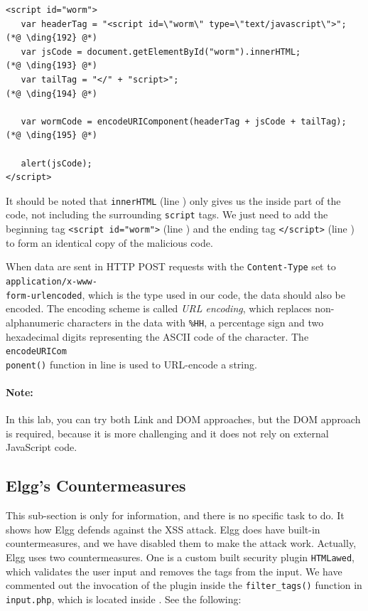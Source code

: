 {\footnotesize
\begin{lstlisting}
<script id="worm">
   var headerTag = "<script id=\"worm\" type=\"text/javascript\">"; (*@ \ding{192} @*)
   var jsCode = document.getElementById("worm").innerHTML;          (*@ \ding{193} @*)
   var tailTag = "</" + "script>";                                  (*@ \ding{194} @*)
   
   var wormCode = encodeURIComponent(headerTag + jsCode + tailTag); (*@ \ding{195} @*)
      
   alert(jsCode);
</script>
\end{lstlisting}
}


It should be noted that {\tt innerHTML} (line ) only gives us the inside part of the
code, not including the surrounding {\tt script} tags. We just need to add the beginning tag
{\tt <script id="worm">} (line ) and the ending tag {\tt </script>} (line )
to form an identical copy of the malicious code.

When data are sent in HTTP POST requests with the {\tt Content-Type} set to {\tt
application/x-www-\\form-urlencoded}, which is the type used in our code, the data should also
be encoded. The encoding scheme is called \textit{URL encoding}, which replaces
non-alphanumeric characters in the data with {\tt \%HH}, a percentage sign and two hexadecimal
digits representing the ASCII code of the character. The {\tt encodeURICom\\ponent()} function
in line  is used to URL-encode a string.

\paragraph{Note:} In this lab, you can try both Link and DOM approaches, but the DOM approach
is required, because it is more challenging and it does not rely on external JavaScript code.




\subsection{Elgg's Countermeasures}


This sub-section is only for information, and there is no specific task to do. 
It shows how Elgg defends against the XSS attack. 
Elgg does have built-in countermeasures, and
we have disabled them to make the
attack work. Actually, Elgg uses two countermeasures. 
One is a custom built security plugin \texttt{HTMLawed}, 
which validates the user input and removes the tags from the input.
We have commented out the invocation of the plugin
inside the \texttt{filter\_tags()} function 
in \texttt{input.php}, which is located inside 
. See the following:

